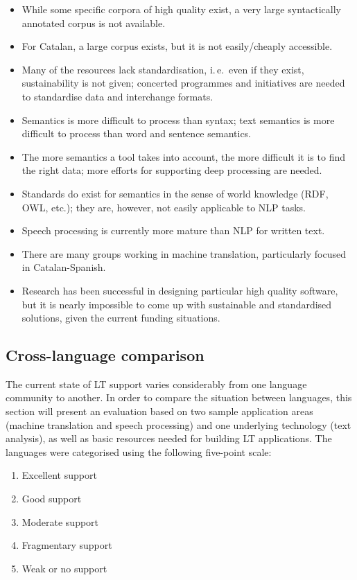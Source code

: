 \begin{multicols}{2}
\begin{itemize}
\item While some specific corpora of high quality exist, a very large syntactically annotated corpus is not available.
\item For Catalan, a large corpus exists, but it is not easily/cheaply accessible.
\item Many of the resources lack standardisation, i.\,e.~even if they exist, sustainability is not given; concerted programmes and initiatives are needed to standardise data and interchange formats.
\item Semantics is more difficult to process than syntax; text semantics is more difficult to process than word and sentence semantics.
\item The more semantics a tool takes into account, the more difficult it is to find the right data; more efforts for supporting deep processing are needed.
\item Standards do exist for semantics in the sense of world knowledge (RDF, OWL, etc.); they are, however, not easily applicable to NLP tasks.
\item Speech processing is currently more mature than NLP for written text.
\item There are many groups working in machine translation, particularly focused in Catalan-Spanish. 
\item Research has been successful in designing particular high quality software, but it is nearly impossible to come up with sustainable and standardised solutions, given the current funding situations.
\end{itemize}

\subsection{Cross-language comparison}

The current state of LT support varies considerably from one language community to another. In order to compare the situation between languages, this section will present an evaluation based on two sample application areas (machine translation and speech processing) and one underlying technology (text analysis), as well as basic resources needed for building LT applications. The languages were categorised using the following five-point scale: 

\begin{enumerate}
\item Excellent support
\item Good support
\item Moderate support
\item Fragmentary support
\item Weak or no support
\end{enumerate}


\end{multicols}
